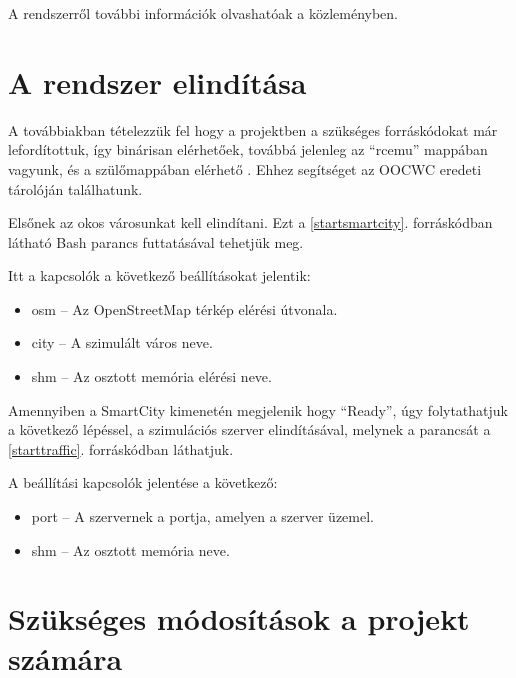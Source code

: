 \documentclass[a4paper,12pt]{report}
\begin{document}
\vspace{2mm}
A rendszerről további információk olvashatóak a \cite{infocomjournal} közleményben.

\section{A rendszer elindítása}
\label{howtostart}

A továbbiakban tételezzük fel hogy a projektben a szükséges forráskódokat már lefordítottuk, így binárisan elérhetőek, továbbá jelenleg az ``rcemu'' mappában vagyunk, és a szülőmappában elérhető . Ehhez segítséget az OOCWC eredeti tárolóján \cite{oocwcrepo} találhatunk.

\vspace{2mm}
Elsőnek az okos városunkat kell elindítani. Ezt a \ref{startsmartcity}. forráskódban látható Bash parancs futtatásával  tehetjük meg.



Itt a kapcsolók a következő beállításokat jelentik:

\begin{itemize}
\item osm -- Az OpenStreetMap térkép elérési útvonala.
\item city -- A szimulált város neve.
\item shm -- Az osztott memória elérési neve.
\end{itemize}

Amennyiben a SmartCity kimenetén megjelenik hogy ``Ready'', úgy folytathatjuk a következő lépéssel, a szimulációs szerver elindításával, melynek a parancsát a \ref{starttraffic}. forráskódban láthatjuk.



A beállítási kapcsolók jelentése a következő:

\begin{itemize}
\item port -- A szervernek a portja, amelyen a szerver üzemel.
\item shm -- Az osztott memória neve.
\end{itemize}

\section{Szükséges módosítások a projekt számára}
\label{changes}
\end{document}
